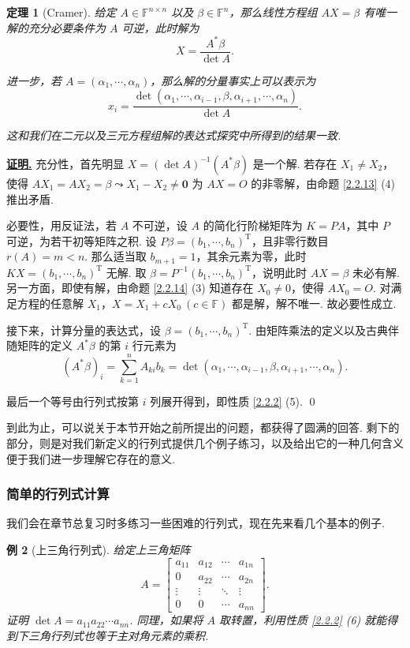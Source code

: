 \documentclass[10pt,openany]{article}
\theoremstyle{thmstyle} %
\newtheorem{theorem}{定理}[subsection]
\theoremstyle{defstyle} %
\theoremstyle{prostyle} %
\theoremstyle{exastyle}
\newtheorem{example}[theorem]{例}
\theoremstyle{remstyle}
\renewenvironment{proof}[1][证明]{\par\underline{\textbf{#1.}} \;\fangsong}{\qed\par}
\newcommand{\T}{^{\text{T}}}
\newcommand{\F}{\mathbb{F}}
\newcommand{\n}{^{n \times n}}
\begin{document}
\begin{theorem}[Cramer]
	给定 \( A \in \F\n \) 以及 \( \beta \in \F^n \)，那么线性方程组 \( AX=\beta \) 有唯一解的充分必要条件为 \( A \) 可逆，此时解为
	\[ X=\frac{A^*\beta}{\det A}. \]
	
	进一步，若 \( A=(\alpha_1,\cdots,\alpha_n) \)，那么解的分量事实上可以表示为
	\[ x_i=\frac{\det(\alpha_1,\cdots,\alpha_{i-1},\beta,\alpha_{i+1},\cdots,\alpha_n)}{\det A}. \]
	
	这和我们在二元以及三元方程组解的表达式探究中所得到的结果一致.
\end{theorem}

\begin{proof}
	充分性，首先明显 \( X=(\det A)^{-1}(A^*\beta) \) 是一个解. 若存在 \( X_1 \neq X_2 \)，使得 \( AX_1=AX_2=\beta \leadsto X_1-X_2 \neq \bm{0} \) 为 \( AX=O \) 的非零解，由命题 \ref{2.2.13} (4) 推出矛盾. 
	
	必要性，用反证法，若 \( A \) 不可逆，设 \( A \) 的简化行阶梯矩阵为 \( K=PA \)，其中 \( P \) 可逆，为若干初等矩阵之积. 设 \( P\beta=(b_1,\cdots,b_n)\T \)，且非零行数目 \( r(A)=m<n \). 那么适当取 \( b_{m+1}=1 \)，其余元素为零，此时 \( KX=(b_1,\cdots,b_n)\T \) 无解. 取 \( \beta=P^{-1}(b_1,\cdots,b_n)\T \)，说明此时 \( AX=\beta \) 未必有解. 另一方面，即使有解，由命题 \ref{2.2.14} (3) 知道存在 \( X_0 \neq 0 \)，使得 \( AX_0=O \). 对满足方程的任意解 \( X_1 \)，\( X=X_1+cX_0 \ (c \in \F) \) 都是解，解不唯一. 故必要性成立.
	
	接下来，计算分量的表达式，设 \( \beta=(b_1,\cdots,b_n)\T \). 由矩阵乘法的定义以及古典伴随矩阵的定义 \( A^*\beta \) 的第 \( i \) 行元素为
	\[ (A^*\beta)_i=\sum_{k=1}^{n} A_{ki}b_k=\det(\alpha_1,\cdots,\alpha_{i-1},\beta,\alpha_{i+1},\cdots,\alpha_n). \]
	
	最后一个等号由行列式按第 \( i \) 列展开得到，即性质 \ref{2.2.2} (5).
\end{proof}

到此为止，可以说关于本节开始之前所提出的问题，都获得了圆满的回答. 剩下的部分，则是对我们新定义的行列式提供几个例子练习，以及给出它的一种几何含义便于我们进一步理解它存在的意义.

\subsubsection{简单的行列式计算}

我们会在章节总复习时多练习一些困难的行列式，现在先来看几个基本的例子.

\begin{example}[上三角行列式]
	给定上三角矩阵
	\[ A= 
	\begin{bmatrix}
		a_{11} & a_{12} & \cdots & a_{1n} \\
		0      & a_{22} & \cdots & a_{2n} \\
		\vdots & \vdots & \ddots & \vdots \\
		0      & 0      & \cdots & a_{nn}
	\end{bmatrix}. 
	\]
	证明 \( \det A=a_{11}a_{22}\cdots a_{nn} \). 同理，如果将 \( A \) 取转置，利用性质 \ref{2.2.2} (6) 就能得到下三角行列式也等于主对角元素的乘积.
\end{example}
\end{document}
